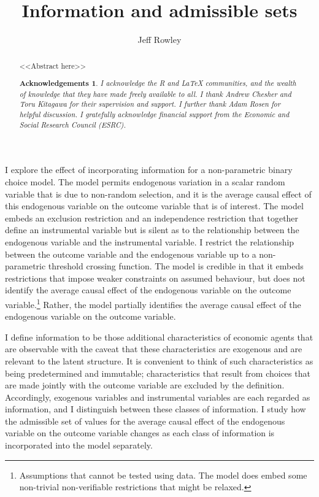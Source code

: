 \documentclass[10pt,a4paper,twoside]{article}
\title{Information and admissible sets}
\author{Jeff Rowley}
\newtheorem*{Acknowledgements}{Acknowledgements}
\numberwithin{equation}{section}
\newcommand{\ESRC}{I gratefully acknowledge financial support from the Economic and Social Research Council (ESRC).}
\newcommand{\RLaTeX}{I acknowledge the \emph{R} and \emph{\LaTeX} communities, and the wealth of knowledge that they have made freely available to all.}
\begin{document}
\maketitle
\vspace{10mm}
\begin{abstract}
\noindent <<Abstract here>>
\begin{Acknowledgements}
{\RLaTeX} I thank Andrew Chesher and Toru Kitagawa for their supervision and support. I further thank Adam Rosen for helpful discussion. {\ESRC}
\end{Acknowledgements}
\end{abstract}
\vspace{5mm}
I explore the effect of incorporating information for a non-parametric binary choice model. The model permits endogenous variation in a scalar random variable that is due to non-random selection, and it is the average causal effect of this endogenous variable on the outcome variable that is of interest. The model embeds an exclusion restriction and an independence restriction that together define an instrumental variable but is silent as to the relationship between the endogenous variable and the instrumental variable. I restrict the relationship between the outcome variable and the endogenous variable up to a non-parametric threshold crossing function. The model is credible \citep{book.manski} in that it embeds restrictions that impose weaker constraints on assumed behaviour, but does not identify the average causal effect of the endogenous variable on the outcome variable.\footnote{Assumptions that cannot be tested using data. The model does embed some non-trivial non-verifiable restrictions that might be relaxed.} Rather, the model partially identifies the average causal effect of the endogenous variable on the outcome variable. 

I define information to be those additional characteristics of economic agents that are observable with the caveat that these characteristics are exogenous and are relevant to the latent structure. It is convenient to think of such characteristics as being predetermined and immutable; characteristics that result from choices that are made jointly with the outcome variable are excluded by the definition. Accordingly, exogenous variables and instrumental variables are each regarded as information, and I distinguish between these classes of information. I study how the admissible set of values for the average causal effect of the endogenous variable on the outcome variable changes as each class of information is incorporated into the model separately. 
\end{document}
